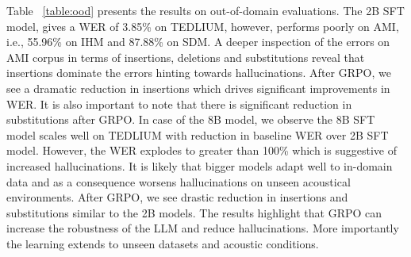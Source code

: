 \documentclass[conference]{IEEEtran}
\begin{document}
Table ~\ref{table:ood} presents the results on out-of-domain evaluations.
The 2B SFT model, gives a WER of 3.85\% on TEDLIUM, however, performs poorly on AMI, i.e., 55.96\% on IHM and 87.88\% on SDM.
A deeper inspection of the errors on AMI corpus in terms of insertions, deletions and substitutions reveal that insertions dominate the errors hinting towards hallucinations.
After GRPO, we see a dramatic reduction in insertions which drives significant improvements in WER.
It is also important to note that there is significant reduction in substitutions after GRPO.
In case of the 8B model, we observe the 8B SFT model scales well on TEDLIUM with reduction in baseline WER over 2B SFT model.
However, the WER explodes to greater than 100\% which is suggestive of increased hallucinations. 
It is likely that bigger models adapt well to in-domain data and as a consequence worsens hallucinations on unseen acoustical environments.
After GRPO, we see drastic reduction in insertions and substitutions similar to the 2B models.
The results highlight that GRPO can increase the robustness of the LLM and reduce hallucinations.
More importantly the learning extends to unseen datasets and acoustic conditions.
\end{document}

